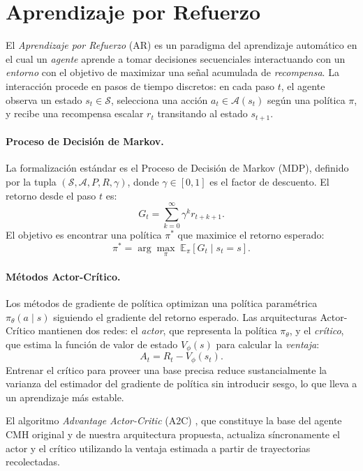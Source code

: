 \documentclass[11pt,a4paper,twoside]{tesis}
\begin{document}
\section{Aprendizaje por Refuerzo}
\label{sec:rl}

El \emph{Aprendizaje por Refuerzo} (AR) es un paradigma del aprendizaje automático en
el cual un \emph{agente} aprende a tomar decisiones secuenciales interactuando con un
\emph{entorno} con el objetivo de maximizar una señal acumulada de \emph{recompensa}.
La interacción procede en pasos de tiempo discretos: en cada paso $t$, el agente observa
un estado $s_t \in \mathcal{S}$, selecciona una acción $a_t \in \mathcal{A}(s_t)$ según
una política $\pi$, y recibe una recompensa escalar $r_t$ transitando al estado
$s_{t+1}$.

\paragraph{Proceso de Decisión de Markov.}
La formalización estándar es el Proceso de Decisión de Markov (MDP), definido por la
tupla $(\mathcal{S}, \mathcal{A}, P, R, \gamma)$, donde $\gamma \in [0,1]$ es el factor
de descuento. El retorno desde el paso $t$ es:
\[
G_t = \sum_{k=0}^{\infty} \gamma^k r_{t+k+1}.
\]
El objetivo es encontrar una política $\pi^*$ que maximice el retorno esperado:
\[
\pi^* = \arg\max_{\pi} \; \mathbb{E}_{\pi}\left[G_t \mid s_t = s\right].
\]

\paragraph{Métodos Actor-Crítico.}
Los métodos de gradiente de política optimizan una política paramétrica $\pi_\theta(a
\mid s)$ siguiendo el gradiente del retorno esperado. Las arquitecturas Actor-Crítico
mantienen dos redes: el \emph{actor}, que representa la política $\pi_\theta$, y el
\emph{crítico}, que estima la función de valor de estado $V_\phi(s)$ para calcular la
\emph{ventaja}:
\[
A_t = R_t - V_\phi(s_t).
\]
Entrenar el crítico para proveer una base precisa reduce sustancialmente la varianza del
estimador del gradiente de política sin introducir sesgo, lo que lleva a un aprendizaje
más estable.

El algoritmo \emph{Advantage Actor-Critic} (A2C) \cite{mnih2016asynchronous}, que
constituye la base del agente CMH original y de nuestra arquitectura propuesta,
actualiza síncronamente el actor y el crítico utilizando la ventaja estimada a partir de
trayectorias recolectadas.
\end{document}
